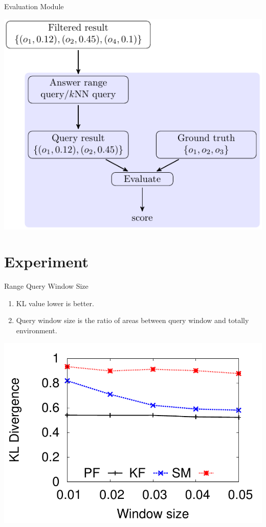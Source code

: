 \documentclass[xcolor={usenames,dvipsnames}]{beamer}
\begin{document}
\begin{frame}[label={sec:orge5e3b0b}]{Evaluation Module}
\begin{center}
\includegraphics[width=.9\textwidth]{img/evaluation.pdf}
\end{center}
\end{frame}

\section{Experiment}
\label{sec:org7753fc0}

\begin{frame}[label={sec:orge7c68c3}]{Range Query Window Size}
\begin{enumerate}
\item KL value lower is better.
\item Query window size is the ratio of areas between query window and
totally environment.
\end{enumerate}

\begin{center}
\includegraphics[width=.7\textwidth]{img/kl-w.pdf}
\end{center}
\end{frame}
\end{document}
